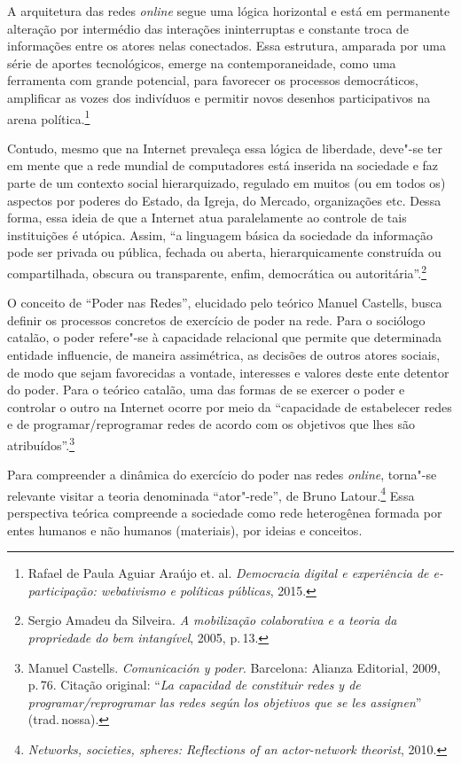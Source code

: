 A arquitetura das redes \textit{online} segue uma lógica horizontal e está em
permanente alteração por intermédio das interações ininterruptas e
constante troca de informações entre os atores nelas conectados. Essa
estrutura, amparada por uma série de aportes tecnológicos, emerge na
contemporaneidade, como uma ferramenta com grande potencial, para
favorecer os processos democráticos, amplificar as vozes dos indivíduos
e permitir novos desenhos participativos na arena política.\footnote{Rafael de Paula Aguiar Araújo et. al. \textit{Democracia digital e experiência de
e-participação: webativismo e políticas públicas}, 2015.}

Contudo, mesmo que na Internet prevaleça essa lógica de liberdade,
deve"-se ter em mente que a rede mundial de computadores está inserida na
sociedade e faz parte de um contexto social hierarquizado, regulado em
muitos (ou em todos os) aspectos por poderes do Estado, da Igreja, do
Mercado, organizações etc. Dessa forma, essa ideia de que a Internet
atua paralelamente ao controle de tais instituições é utópica. Assim,
``a linguagem básica da sociedade da informação pode ser privada ou
pública, fechada ou aberta, hierarquicamente construída ou
compartilhada, obscura ou transparente, enfim, democrática ou
autoritária''.\footnote{Sergio Amadeu da Silveira. \textit{A mobilização colaborativa e a
teoria da propriedade do bem intangível}, 2005, p.\,13.}

O conceito de ``Poder nas Redes'', elucidado pelo teórico Manuel
Castells, busca definir os processos concretos de exercício de
poder na rede. Para o sociólogo catalão, o poder refere"-se à capacidade
relacional que permite que determinada entidade influencie, de maneira
assimétrica, as decisões de outros atores sociais, de modo que sejam
favorecidas a vontade, interesses e valores deste ente detentor do
poder. Para o teórico catalão, uma das formas de se exercer o poder e
controlar o outro na Internet ocorre por meio da ``capacidade de
estabelecer redes e de programar/reprogramar redes de acordo com os
objetivos que lhes são atribuídos''.\footnote{Manuel Castells. \textit{Comunicación y poder}. Barcelona: Alianza Editorial, 2009, p.\,76. Citação original: ``\textit{La capacidad de constituir redes y de programar/reprogramar las redes según los objetivos que se les
  assignen}'' (trad.\,nossa).}

Para compreender a dinâmica do exercício do poder nas redes \textit{online},
torna"-se relevante visitar a teoria denominada ``ator"-rede'', de Bruno
Latour.\footnote{\textit{Networks, societies, spheres: Reflections of an
actor-network theorist}, 2010.} Essa perspectiva teórica compreende a sociedade como rede
heterogênea formada por entes humanos e não humanos (materiais), por
ideias e conceitos.


